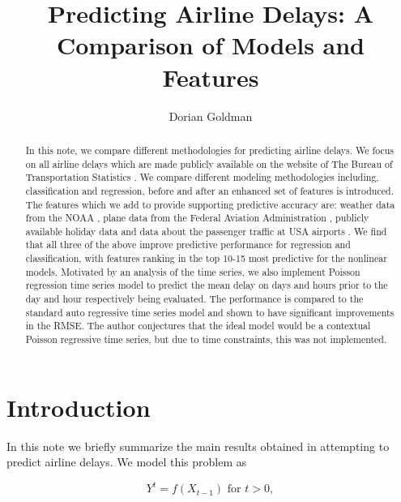 \documentclass[twocolumn,showpacs,%
  nofootinbib,aps,superscriptaddress,%
  eqsecnum,prd,notitlepage,showkeys,10pt]{revtex4-1}
\begin{document}
\title{Predicting Airline Delays: A Comparison of Models and Features}
\author{Dorian Goldman}

\begin{abstract}
In this note, we compare different methodologies for predicting airline delays. We focus on all airline delays which are made publicly available on the website of
The Bureau of Transportation Statistics \cite{ontime}. We compare different modeling methodologies including, classification and regression, before and after an enhanced set of features
is introduced. The features which we add to provide supporting predictive accuracy are: weather data from the NOAA \cite{weather}, plane data from the Federal Aviation Administration \cite{aviation}, publicly available holiday data and data about the passenger traffic at USA airports \cite{boarding}. We find
that all three of the above improve predictive performance for regression and classification, with features ranking in the top 10-15 most predictive for the nonlinear models. Motivated by an analysis of the time series, we also implement Poisson regression time series model to predict the mean delay on days and hours prior 
to the day and hour respectively being evaluated. The performance is compared to the standard auto regressive time series model and shown to have significant improvements in the RMSE. The author conjectures that the ideal model would be a contextual Poisson regressive time series, but due to time constraints, this was not implemented. 
\end{abstract}

\maketitle

\section{Introduction}

In this note we briefly summarize the main results obtained in attempting to predict airline delays. We model this problem as 

\begin{equation}
Y^t = f( X_{t-1}) \textrm{ for } t > 0,
\end{equation}
\end{document}
